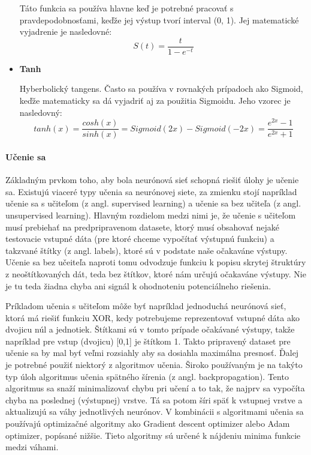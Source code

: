 \begin{itemize}
		Táto funkcia sa používa hlavne keď je potrebné pracovať s pravdepodobnosťami, keďže jej výstup tvorí interval (0, 1). Jej matematické vyjadrenie je nasledovné:
		\begin{equation}
		S(t) = \frac{t}{1-e^{-t}}
		\end{equation}
		
		\item {\textbf{Tanh}}
		
		Hyberbolický tangens. Často sa používa v rovnakých prípadoch ako Sigmoid, keďže matematicky sa dá vyjadriť aj za použitia Sigmoidu. Jeho vzorec je nasledovný:
		\begin{equation}
			tanh(x)=\frac{cosh(x)}{sinh(x)}=Sigmoid(2x)-Sigmoid(-2x)=\frac{e^{2x}-1}{e^{2x}+1}
		\end{equation}
	\end{itemize}
	
	\paragraph{Učenie sa}
	
	Základným prvkom toho, aby bola neurónová sieť schopná riešiť úlohy je učenie sa. Existujú viaceré typy učenia sa neurónovej siete, za zmienku stojí napríklad učenie sa s učiteľom (z angl. supervised learning) a učenie sa bez učiteľa (z angl. unsupervised learning\cite{unsupervised}). Hlavným rozdielom medzi nimi je, že učenie s učiteľom musí prebiehať na predpripravenom datasete, ktorý musí obsahovať nejaké testovacie vstupné dáta (pre ktoré chceme vypočítať výstupnú funkciu) a takzvané štítky (z angl. labels), ktoré sú v podstate naše očakaváne výstupy. Učenie sa bez učeiteľa naproti tomu odvodzuje funkciu k popisu skrytej štruktúry z neoštítkovaných dát, teda bez štítkov, ktoré nám určujú očakaváne výstupy. Nie je tu teda žiadna chyba ani signál k ohodnoteniu potenciálneho riešenia. 
	
	
	Príkladom učenia s učiteľom môže byť napríklad jednoduchá neurónová sieť, ktorá má riešiť funkciu XOR\cite{neuron}, kedy potrebujeme reprezentovať vstupné dáta ako dvojicu núl a jednotiek. Štítkami sú v tomto prípade očakávané výstupy, takže napríklad pre vstup (dvojicu) [0,1] je štítkom 1. Takto pripravený dataset pre učenie sa by mal byť veľmi rozsiahly aby sa dosiahla maximálna presnosť. Ďalej je potrebné použiť niektorý z algoritmov učenia. Široko používaným je na takýto typ úloh algoritmus učenia spätného šírenia (z angl. backpropagation). Tento algoritmus sa snaží minimalizovať chybu pri učení a to tak, že najprv sa vypočíta chyba na poslednej (výstupnej) vrstve. Tá sa potom šíri späť k vstupnej vrstve a aktualizujú sa váhy jednotlivých neurónov.  V kombinácii s algoritmami učenia sa používajú optimizačné algoritmy ako Gradient descent optimizer\cite{gradient_descent} alebo Adam optimizer\cite{adam}, popísané nižšie. Tieto algoritmy sú určené k nájdeniu minima funkcie medzi váhami.  	
	
